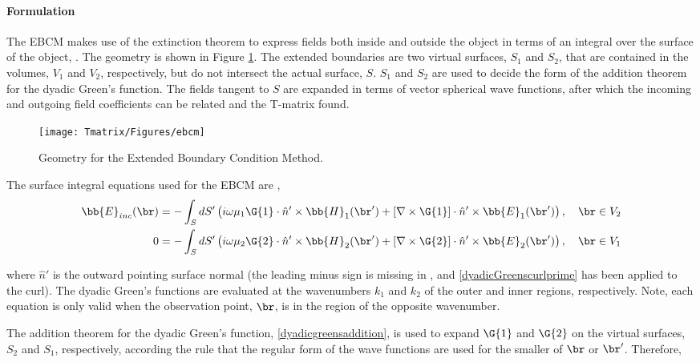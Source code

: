 \paragraph{Formulation}
The EBCM makes use of the extinction theorem to express fields both inside and outside the object in terms of an integral over the surface of the object, \cite{chew1995waves}. The geometry is shown in Figure \ref{geoebcm}. The extended boundaries are two virtual surfaces, $S_1$ and $S_2$, that are contained in the volumes, $V_1$ and $V_2$, respectively, but do not intersect the actual surface, $S$. $S_1$ and $S_2$ are used to decide the form of the addition theorem for the dyadic Green's function. The fields tangent to $S$ are expanded in terms of vector spherical wave functions, after which the incoming and outgoing field coefficients can be related and the T-matrix found.  


\begin{figure}[H] 
   \centering
   \texttt{[image: Tmatrix/Figures/ebcm]} 
   \caption{Geometry for the Extended Boundary Condition Method.}
   \label{geoebcm}
\end{figure}

The surface integral equations used for the EBCM are \cite{chew1995waves,duan2015experimental}, 
\begin{align}
\bb{E}_{inc}(\br) &= -\int_S dS'\left( i \omega \mu_1 \G{1} \cdot \hat{n}' \times \bb{H}_1(\br') + \left[\nabla\times \G{1} \right] \cdot \hat{n}' \times \bb{E}_1(\br') \right), \quad \br \in V_2  \label{ebcmSIEV2}\\
0 &= -\int_S dS'\left( i \omega \mu_2 \G{2} \cdot \hat{n}' \times \bb{H}_2(\br') + \left[\nabla\times \G{2} \right] \cdot \hat{n}' \times \bb{E}_2(\br') \right), \quad \br \in V_1  \label{ebcmSIEV1}
\end{align}

\noindent where $\hat{n}'$ is the outward pointing surface normal (the leading minus sign is missing in \cite{chew1995waves}, and \eqref{dyadicGreenscurlprime} has been applied to the curl). The dyadic Green's functions are evaluated at the wavenumbers $k_1$ and $k_2$ of the outer and inner regions, respectively.  Note, each equation is only valid when the observation point, $\br$, is in the region of the opposite wavenumber. 

The addition theorem for the dyadic Green's function, \eqref{dyadicgreensaddition}, is used to expand $\G{1}$ and $\G{2}$ on the virtual surfaces, $S_2$ and $S_1$, respectively, according the rule that the regular form of the wave functions are used for the smaller of $\br$ or $\br'$.  Therefore,

